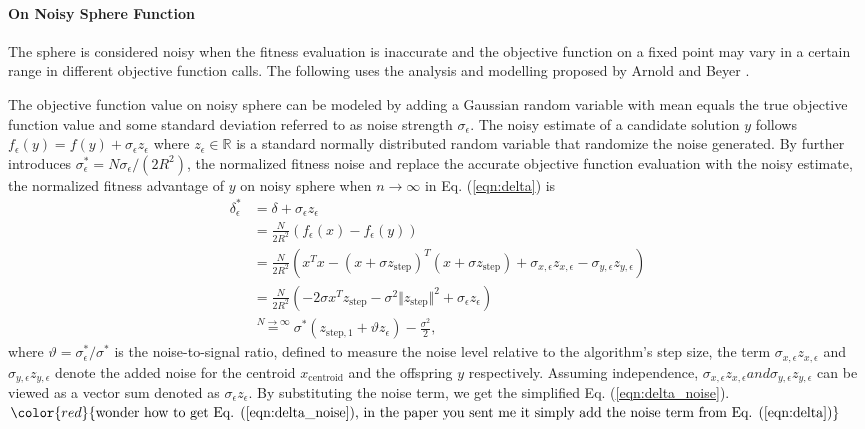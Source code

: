 \paragraph{On Noisy Sphere Function}
The sphere is considered noisy when the fitness evaluation is inaccurate and the objective function on a fixed point may vary in a certain range in different objective function calls. The following uses the analysis and modelling proposed by Arnold and Beyer \cite{ARNOLD2001127}. 

The objective function value on noisy sphere can be modeled by adding a Gaussian random variable with mean equals the true objective function value and some standard deviation referred to as noise strength $\sigma_\epsilon$. The noisy estimate of a candidate solution $y$ follows $f_{\epsilon}(y) = f(y) + \sigma_{\epsilon}z_\epsilon$ where $z_\epsilon \in \mathbb{R}$ is a standard normally distributed random variable that randomize the noise generated. By further introduces $\sigma_\epsilon^* = N \sigma_\epsilon / (2R^2)$, the normalized fitness noise \cite{1284729} and replace the accurate objective function evaluation with the noisy estimate, the normalized fitness advantage of $y$ on noisy sphere when $n \rightarrow \infty$ in Eq. (\ref{eqn:delta}) is
\begin{align}
\delta_\epsilon^* & = \delta + \sigma_\epsilon z_\epsilon\\
&=  \frac{N}{2R^2}\left( f_\epsilon (x) - f_\epsilon(y)\right)  \nonumber\\ 
& = \frac{N}{2R^2} (x^Tx - (x+\sigma z_{\text{step}})^T (x+\sigma z_{\text{step}}) +\sigma_{x,\epsilon} z_{x,\epsilon}-\sigma_{y,\epsilon} z_{y,\epsilon}) \nonumber\\
& = \frac{N}{2R^2} (-2 \sigma x^Tz_{\text{step}} - \sigma^2 \Vert z_{\text{step}}\Vert^2 +\sigma_\epsilon z_\epsilon) \nonumber\\
&\overset{N \rightarrow \infty}{=} \sigma^* (z_{\text{step},1} + \vartheta z_\epsilon ) - \frac{\sigma^2}{2}, \label{eqn:delta_noise}{}
\end{align}
where $\vartheta = \sigma_\epsilon^*/\sigma^*$ is the noise-to-signal ratio, defined to measure the noise level relative to the algorithm's step size, the term $\sigma_{x,\epsilon} z_{x,\epsilon}$ and $\sigma_{y,\epsilon} z_{y,\epsilon}$ denote the added noise for the centroid $x_{\text{centroid}}$ and the offspring $y$ respectively. Assuming independence, $\sigma_{x,\epsilon} z_{x,\epsilon} and \sigma_{y,\epsilon} z_{y,\epsilon}$ can be viewed as a vector sum denoted as $\sigma_\epsilon z_\epsilon$. By substituting the noise term, we get the simplified Eq. (\ref{eqn:delta_noise}).
$\color{red}{\text{wonder how to get Eq. (\ref{eqn:delta_noise}), in the paper you sent me it simply add the noise term from Eq. (\ref{eqn:delta})}}$

